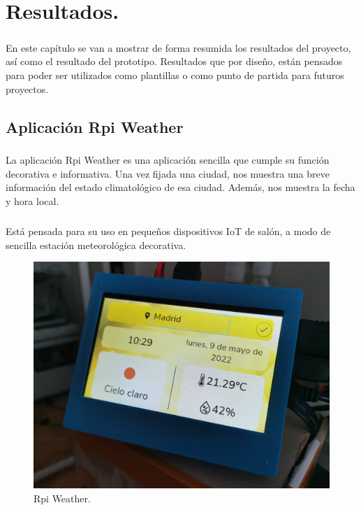 \chapter{Resultados.}\label{sec:resultados}

\paragraph{}En este capítulo se van a mostrar de forma resumida los resultados del proyecto,
así como el resultado del prototipo. Resultados que por diseño, están pensados para
poder ser utilizados como plantillas o como punto de partida para futuros proyectos.

\section{Aplicación Rpi Weather}\label{sec:rpiweather}

\paragraph{}La aplicación Rpi Weather es una aplicación sencilla que cumple su función
decorativa e informativa. Una vez fijada una ciudad, nos muestra una breve información
del estado climatológico de esa ciudad. Además, nos muestra la fecha y hora local.

\paragraph{}Está pensada para su uso en pequeños dispositivos IoT de salón, a modo de
sencilla estación meteorológica decorativa.

\begin{figure}[H]
	\centering
	\includegraphics[width=0.70\linewidth]{imgs/app1}
	\caption[Rpi Weather]{Rpi Weather.}
	\label{img:rpi-weather-app}
\end{figure}

